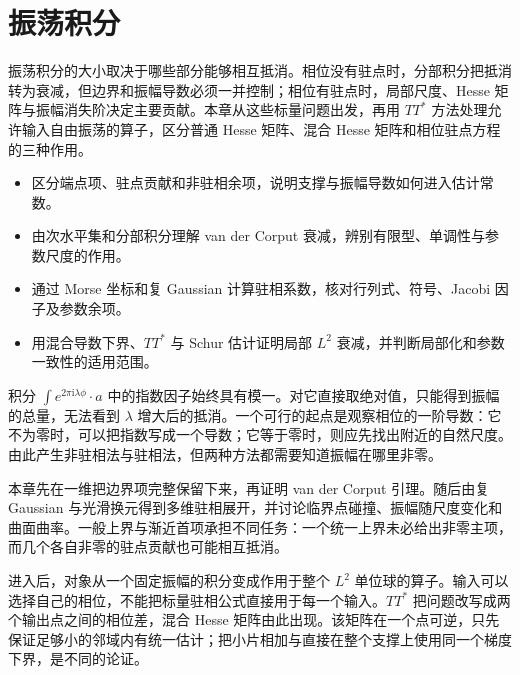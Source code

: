 \chapter{振荡积分}
\label{b2:ch:21}
\begin{chapterabstract}
振荡积分的大小取决于哪些部分能够相互抵消。相位没有驻点时，分部积分把抵消转为衰减，但边界和振幅导数必须一并控制；相位有驻点时，局部尺度、Hesse 矩阵与振幅消失阶决定主要贡献。本章从这些标量问题出发，再用 \(TT^*\) 方法处理允许输入自由振荡的算子，区分普通 Hesse 矩阵、混合 Hesse 矩阵和相位驻点方程的三种作用。
\end{chapterabstract}

\begin{learninggoals}\begin{itemize}
\item\label{b2:item:21-goal-1}区分端点项、驻点贡献和非驻相余项，说明支撑与振幅导数如何进入估计常数。
\item\label{b2:item:21-goal-2}由次水平集和分部积分理解 van der Corput 衰减，辨别有限型、单调性与参数尺度的作用。
\item\label{b2:item:21-goal-3}通过 Morse 坐标和复 Gaussian 计算驻相系数，核对行列式、符号、Jacobi 因子及参数余项。
\item\label{b2:item:21-goal-4}用混合导数下界、\(TT^*\) 与 Schur 估计证明局部 \(L^2\) 衰减，并判断局部化和参数一致性的适用范围。
\end{itemize}\end{learninggoals}

积分 \(\int e^{2\pi\mathrm i\lambda\phi}\cdot a\) 中的指数因子始终具有模一。对它直接取绝对值，只能得到振幅的总量，无法看到 \(\lambda\) 增大后的抵消。一个可行的起点是观察相位的一阶导数：它不为零时，可以把指数写成一个导数；它等于零时，则应先找出附近的自然尺度。由此产生非驻相法与驻相法，但两种方法都需要知道振幅在哪里非零。

\ProseParagraphBreak

本章先在一维把边界项完整保留下来，再证明 van der Corput 引理。随后由复 Gaussian 与光滑换元得到多维驻相展开，并讨论临界点碰撞、振幅随尺度变化和曲面曲率。一般上界与渐近首项承担不同任务：一个统一上界未必给出非零主项，而几个各自非零的驻点贡献也可能相互抵消。

\ProseParagraphBreak

进入后，对象从一个固定振幅的积分变成作用于整个 \(L^2\) 单位球的算子。输入可以选择自己的相位，不能把标量驻相公式直接用于每一个输入。\(TT^*\) 把问题改写成两个输出点之间的相位差，混合 Hesse 矩阵由此出现。该矩阵在一个点可逆，只先保证足够小的邻域内有统一估计；把小片相加与直接在整个支撑上使用同一个梯度下界，是不同的论证。

